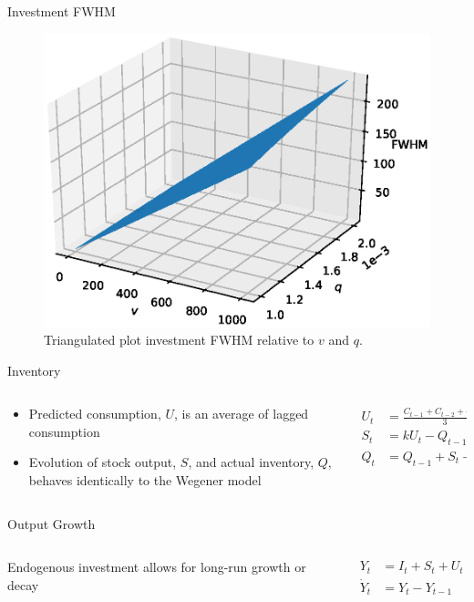 \documentclass{beamer}
\begin{document}
\begin{frame}{Investment FWHM}
	\begin{figure}
		\centering
		\includegraphics[height=0.8\textheight]{widthinvestment.eps}
		\caption{Triangulated plot investment FWHM relative to $v$ and $q$.}
	\end{figure}
\end{frame}

\begin{frame}{Inventory}
	\begin{columns}
	\begin{column}{0.5\textwidth}
		\begin{itemize}
			\item Predicted consumption, $U$, is an average of lagged consumption
			\item Evolution of stock output, $S$, and actual inventory, $Q$, behaves identically to the Wegener model
		\end{itemize}
	\end{column}
	\begin{column}{0.5\textwidth}
		\begin{align*}
			U_t &= \frac{C_{t-1}+C_{t-2}+C_{t-2}}{3}\\
			S_t &= kU_t-Q_{t-1}\\
			Q_t &= Q_{t-1} + S_t + (U_t-C_t)
		\end{align*}
	\end{column}
	\end{columns}
\end{frame}

\begin{frame}{Output Growth}
	\begin{columns}
	\begin{column}{0.5\textwidth}
		Endogenous investment allows for long-run growth or decay 
	\end{column}
	\begin{column}{0.5\textwidth}
		\begin{align*}
			Y_t &= I_t + S_t + U_t\\
			\dot Y_t &= Y_{t}-Y_{t-1}
		\end{align*}
	\end{column}
	\end{columns}
\end{frame}
\end{document}
